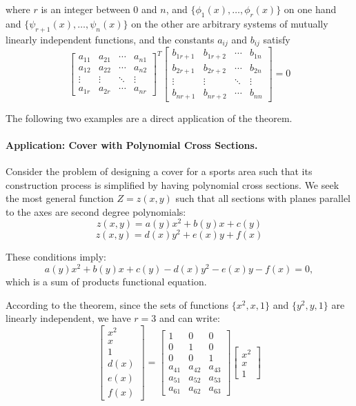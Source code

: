 \begin{theorem}
where $r$ is an integer between 0 and $n$, and $\{\phi_1(x), \ldots, \phi_r(x)\}$ on one hand and $\{\psi_{r+1}(x), \ldots, \psi_n(x)\}$ on the other are arbitrary systems of mutually linearly independent functions, and the constants $a_{ij}$ and $b_{ij}$ satisfy
$$\begin{bmatrix} a_{11} & a_{21} & \cdots & a_{n1} \\ a_{12} & a_{22} & \cdots & a_{n2} \\ \vdots & \vdots & \ddots & \vdots \\ a_{1r} & a_{2r} & \cdots & a_{nr} \end{bmatrix}^T \begin{bmatrix} b_{1r+1} & b_{1r+2} & \cdots & b_{1n} \\ b_{2r+1} & b_{2r+2} & \cdots & b_{2n} \\ \vdots & \vdots & \ddots & \vdots \\ b_{nr+1} & b_{nr+2} & \cdots & b_{nn} \end{bmatrix} = 0$$
\end{theorem}

\vspace*{5mm}

The following two examples are a direct application of the theorem.

\paragraph{Application: Cover with Polynomial Cross Sections.}
Consider the problem of designing a cover for a sports area such that its construction process is simplified by having polynomial cross sections. We seek the most general function $Z = z(x,y)$ such that all sections with planes parallel to the axes are second degree polynomials:
$$z(x,y) = a(y)x^2 + b(y)x + c(y)$$
$$z(x,y) = d(x)y^2 + e(x)y + f(x)$$

These conditions imply:
$$a(y)x^2 + b(y)x + c(y) - d(x)y^2 - e(x)y - f(x) = 0,$$
which is a sum of products functional equation.

According to the theorem, since the sets of functions $\{x^2, x, 1\}$ and $\{y^2, y, 1\}$ are linearly independent, we have $r = 3$ and can write:
$$\begin{bmatrix} x^2 \\ x \\ 1 \\ d(x) \\ e(x) \\ f(x) \end{bmatrix} = \begin{bmatrix} 1 & 0 & 0 \\ 0 & 1 & 0 \\ 0 & 0 & 1 \\ a_{41} & a_{42} & a_{43} \\ a_{51} & a_{52} & a_{53} \\ a_{61} & a_{62} & a_{63} \end{bmatrix} \begin{bmatrix} x^2 \\ x \\ 1 \end{bmatrix}$$

